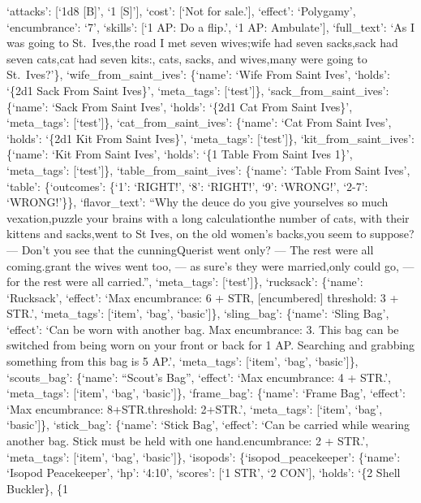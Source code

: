 \documentclass[
  letterpaper,
  DIV=11,
  numbers=noendperiod]{scrartcl}
\begin{document}
`attacks': {[}`1d8 {[}B{]}', `1 {[}S{]}'{]}, `cost': {[}`Not for
sale.'{]}, `effect': `Polygamy', `encumbrance': `7', `skills': {[}`1 AP:
Do a flip.', `1 AP: Ambulate'{]}, `full\_text': `As I was going to
St.~Ives,\nUpon the road I met seven wives;\nEvery wife had seven
sacks,\nEvery sack had seven cats,\nEvery cat had seven kits:\nKits,
cats, sacks, and wives,\nHow many were going to St.~Ives?'\},
`wife\_from\_saint\_ives': \{`name': `Wife From Saint Ives', `holds':
`\{2d1 Sack From Saint Ives\}', `meta\_tags': {[}`test'{]}\},
`sack\_from\_saint\_ives': \{`name': `Sack From Saint Ives', `holds':
`\{2d1 Cat From Saint Ives\}', `meta\_tags': {[}`test'{]}\},
`cat\_from\_saint\_ives': \{`name': `Cat From Saint Ives', `holds':
`\{2d1 Kit From Saint Ives\}', `meta\_tags': {[}`test'{]}\},
`kit\_from\_saint\_ives': \{`name': `Kit From Saint Ives', `holds': `\{1
Table From Saint Ives 1\}', `meta\_tags': {[}`test'{]}\},
`table\_from\_saint\_ives': \{`name': `Table From Saint Ives', `table':
\{`outcomes': \{`1': `RIGHT!', `8': `RIGHT!', `9': `WRONG!', `2-7':
`WRONG!'\}\}, `flavor\_text': ``Why the deuce do you give yourselves so
much vexation,\nAnd puzzle your brains with a long calculation\nOf the
number of cats, with their kittens and sacks,\nWhich went to St Ives, on
the old women's backs,\nAs you seem to suppose? --- Don't you see that
the cunning\nOld Querist went only? --- The rest were all
coming.\nBut grant the wives went too, --- as sure's they were
married,\nEight only could go, --- for the rest were all carried.'',
`meta\_tags': {[}`test'{]}\}, `rucksack': \{`name': `Rucksack',
`effect': `Max encumbrance: 6 + STR, {[}encumbered{]} threshold: 3 +
STR.', `meta\_tags': {[}`item', `bag', `basic'{]}\}, `sling\_bag':
\{`name': `Sling Bag', `effect': `Can be worn with another bag. Max
encumbrance: 3. This bag can be switched from being worn on your front
or back for 1 AP. Searching and grabbing something from this bag is 5
AP.', `meta\_tags': {[}`item', `bag', `basic'{]}\}, `scouts\_bag':
\{`name': ``Scout's Bag'', `effect': `Max encumbrance: 4 + STR.',
`meta\_tags': {[}`item', `bag', `basic'{]}\}, `frame\_bag': \{`name':
`Frame Bag', `effect': `Max encumbrance: 8+STR.\n[encumbered] threshold:
2+STR.', `meta\_tags': {[}`item', `bag', `basic'{]}\}, `stick\_bag':
\{`name': `Stick Bag', `effect': `Can be carried while wearing another
bag. Stick must be held with one hand.\nMax encumbrance: 2 + STR.',
`meta\_tags': {[}`item', `bag', `basic'{]}\}, `isopods':
\{`isopod\_peacekeeper': \{`name': `Isopod Peacekeeper', `hp': `4:10',
`scores': {[}`1 STR', `2 CON'{]}, `holds': `\{2 Shell Buckler\}, \{1
\end{document}
